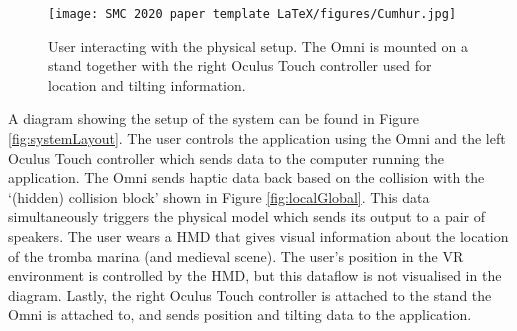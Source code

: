 \documentclass[dvipsnames, pdftex]{article}
\begin{document}

\begin{figure}[ht]\texttt{[image: SMC 2020 paper template LaTeX/figures/Cumhur.jpg]}
\centering
  \caption{User interacting with the physical setup. The Omni is mounted on a  stand together with the right Oculus Touch controller used for location and tilting information. \label{fig:physicalSetup}}
\end{figure}

A diagram showing the setup of the system can be found in Figure \ref{fig:systemLayout}. The user controls the application using the Omni and the left Oculus Touch controller which sends data to the computer running the application. The Omni sends haptic data back based on the collision with the `(hidden) collision block' shown in Figure \ref{fig:localGlobal}. This data simultaneously triggers the physical model which sends its output to a pair of speakers. The user wears a HMD that gives visual information about the location of the tromba marina (and medieval scene). The user's position in the VR environment is controlled by the HMD, but this dataflow is not visualised in the diagram. Lastly, the right Oculus Touch controller is attached to the stand the Omni is attached to, and sends position and tilting data to the application.
\end{document}
